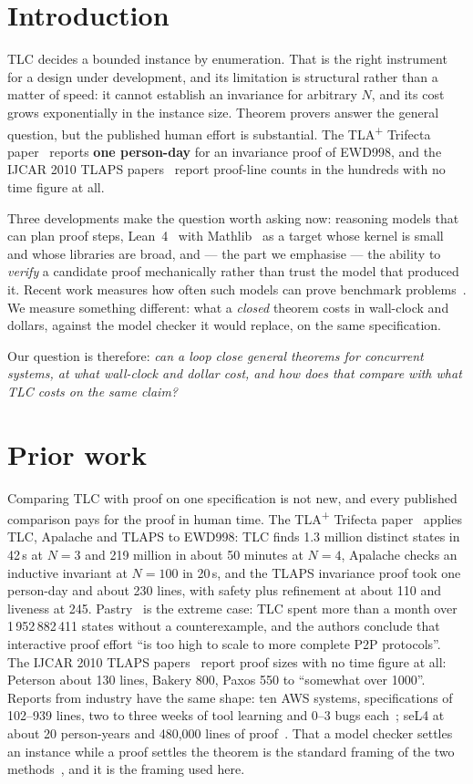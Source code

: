 \documentclass[11pt,a4paper]{article}
\begin{document}
\section{Introduction}

TLC decides a bounded instance by enumeration. That is the right instrument for a design under
development, and its limitation is structural rather than a matter of speed: it cannot establish an
invariance for arbitrary $N$, and its cost grows exponentially in the instance size. Theorem provers
answer the general question, but the published human effort is substantial. The TLA\textsuperscript{+}
Trifecta paper~\cite{trifecta} reports \textbf{one person-day} for an invariance proof of EWD998, and
the IJCAR 2010 TLAPS papers~\cite{tlaps-ijcar} report proof-line counts in the hundreds with no time
figure at all.

Three developments make the question worth asking now: reasoning models that can plan proof steps,
Lean~4~\cite{lean4} with Mathlib~\cite{mathlib} as a target whose kernel is small and whose libraries
are broad, and --- the part we emphasise --- the ability to \emph{verify} a candidate proof mechanically
rather than trust the model that produced it. Recent work measures how often such models can prove
benchmark problems~\cite{deepseek-prover-v2,kimina-prover,goedel-prover}. We measure something
different: what a \emph{closed} theorem costs in wall-clock and dollars, against the model checker it
would replace, on the same specification.

Our question is therefore: \emph{can a loop close general theorems for concurrent systems, at what
wall-clock and dollar cost, and how does that compare with what TLC costs on the same claim?}

\section{Prior work}

Comparing TLC with proof on one specification is not new, and every published comparison pays for the
proof in human time. The TLA\textsuperscript{+} Trifecta paper~\cite{trifecta} applies TLC, Apalache and
TLAPS to EWD998: TLC finds 1.3 million distinct states in 42\,s at $N=3$ and 219 million in about
50 minutes at $N=4$, Apalache checks an inductive invariant at $N=100$ in 20\,s, and the TLAPS
invariance proof took one person-day and about 230 lines, with safety plus refinement at about 110 and
liveness at 245. Pastry~\cite{pastry} is the extreme case: TLC spent more than a month over
1\,952\,882\,411 states without a counterexample, and the authors conclude that interactive proof effort
``is too high to scale to more complete P2P protocols''. The IJCAR 2010 TLAPS papers~\cite{tlaps-ijcar}
report proof sizes with no time figure at all: Peterson about 130 lines, Bakery 800, Paxos 550 to
``somewhat over 1000''. Reports from industry have the same shape: ten AWS systems, specifications of
102--939 lines, two to three weeks of tool learning and 0--3 bugs each~\cite{aws}; seL4 at about
20 person-years and 480{,}000 lines of proof~\cite{sel4}. That a model checker settles an instance while
a proof settles the theorem is the standard framing of the two methods~\cite{clarke-wing}, and it is the
framing used here.
\end{document}
